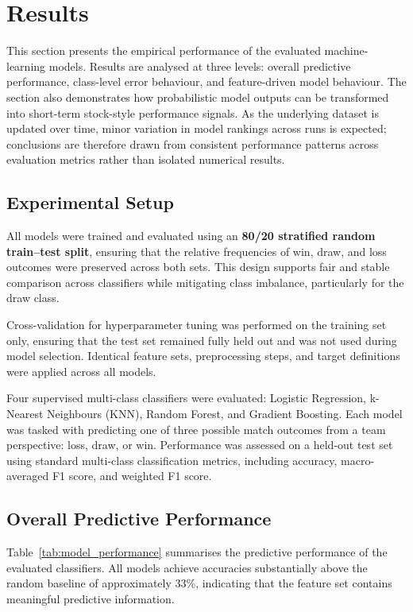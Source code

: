 \documentclass[11pt,a4paper]{article}
\begin{document}
\section{Results}
\label{sec:results}

This section presents the empirical performance of the evaluated machine-learning models. Results are analysed at three levels: overall predictive performance, class-level error behaviour, and feature-driven model behaviour. The section also demonstrates how probabilistic model outputs can be transformed into short-term stock-style performance signals. As the underlying dataset is updated over time, minor variation in model rankings across runs is expected; conclusions are therefore drawn from consistent performance patterns across evaluation metrics rather than isolated numerical results.

\subsection{Experimental Setup}

All models were trained and evaluated using an \textbf{80/20 stratified random train–test split}, ensuring that the relative frequencies of win, draw, and loss outcomes were preserved across both sets. This design supports fair and stable comparison across classifiers while mitigating class imbalance, particularly for the draw class.

Cross-validation for hyperparameter tuning was performed on the training set only, ensuring that the test set remained fully held out and was not used during model selection. Identical feature sets, preprocessing steps, and target definitions were applied across all models.

Four supervised multi-class classifiers were evaluated: Logistic Regression, k-Nearest Neighbours (KNN), Random Forest, and Gradient Boosting. Each model was tasked with predicting one of three possible match outcomes from a team perspective: loss, draw, or win. Performance was assessed on a held-out test set using standard multi-class classification metrics, including accuracy, macro-averaged F1 score, and weighted F1 score.


\subsection{Overall Predictive Performance}

Table~\ref{tab:model_performance} summarises the predictive performance of the evaluated classifiers. All models achieve accuracies substantially above the random baseline of approximately 33\%, indicating that the feature set contains meaningful predictive information.
\end{document}
